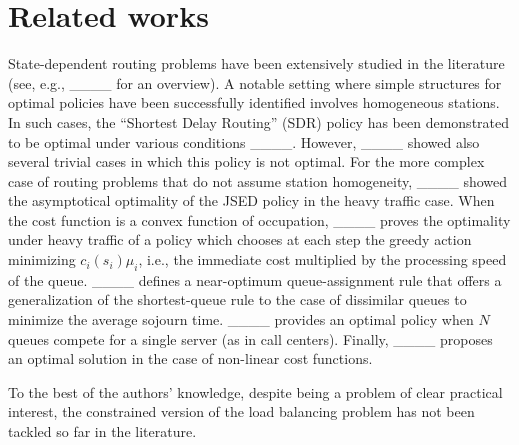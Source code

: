 \section{Related works}
\label{sec:related works}

State-dependent routing problems have been extensively studied in the literature (see, e.g., ____ for an overview). A notable setting where simple structures for optimal policies have been successfully identified involves homogeneous stations. In such cases, the ``Shortest Delay Routing'' (SDR) policy has been demonstrated to be optimal under various conditions ____.
However, ____ showed also several trivial cases in which this policy is not optimal.
For the more complex case of routing problems that do not assume station homogeneity, ____ showed the asymptotical optimality of the JSED policy in the heavy traffic case. When the cost function is a convex function of occupation, ____ proves the optimality under heavy traffic of a policy which chooses at each step the greedy action minimizing $c_i(s_i) \mu_i$, i.e., the immediate cost multiplied by the processing speed of the queue.
____ defines a near-optimum queue-assignment rule that offers a generalization of the shortest-queue rule to the case of dissimilar queues to minimize the average sojourn time. ____ provides an optimal policy when $N$ queues compete for a single server (as in call centers). Finally, ____ proposes an optimal solution in the case of non-linear cost functions. 
\begin{comment}
\paragraph{Queues with admission cost (pricing)}
____

____

____

____
    
\end{comment}
To the best of the authors' knowledge, despite being a problem of clear practical interest, the constrained version of the load balancing problem has not been tackled so far in the literature. 

